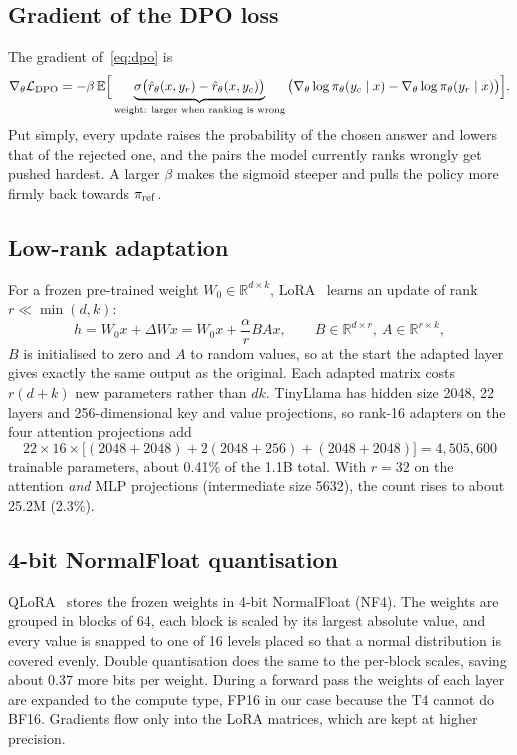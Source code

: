 \subsection{Gradient of the DPO loss}
The gradient of~\eqref{eq:dpo} is
\begin{equation}
  \nabla_\theta\mathcal{L}_{\mathrm{DPO}} = -\beta\,\mathbb{E}\Big[\underbrace{\sigma\big(\hat r_\theta(x,y_r)-\hat r_\theta(x,y_c)\big)}_{\text{weight: larger when ranking is wrong}}\big(\nabla_\theta\log\pi_\theta(y_c\mid x) - \nabla_\theta\log\pi_\theta(y_r\mid x)\big)\Big].
\end{equation}
Put simply, every update raises the probability of the chosen answer and lowers that of the rejected one, and the pairs the model currently ranks wrongly get pushed hardest. A larger $\beta$ makes the sigmoid steeper and pulls the policy more firmly back towards $\pi_{\mathrm{ref}}$.

\subsection{Low-rank adaptation}
For a frozen pre-trained weight $W_0\in\mathbb{R}^{d\times k}$, LoRA~\cite{hu2022lora} learns an update of rank $r\ll\min(d,k)$:
\begin{equation}
  h = W_0x + \Delta Wx = W_0x + \frac{\alpha}{r}BAx,\qquad B\in\mathbb{R}^{d\times r},\ A\in\mathbb{R}^{r\times k},
  \label{eq:lora}
\end{equation}
$B$ is initialised to zero and $A$ to random values, so at the start the adapted layer gives exactly the same output as the original. Each adapted matrix costs $r(d+k)$ new parameters rather than $dk$. TinyLlama has hidden size 2048, 22 layers and 256-dimensional key and value projections, so rank-16 adapters on the four attention projections add
\[
22\times16\times\big[(2048+2048)+2(2048+256)+(2048+2048)\big] = 4{,}505{,}600
\]
trainable parameters, about 0.41\% of the 1.1B total. With $r=32$ on the attention \emph{and} MLP projections (intermediate size 5632), the count rises to about 25.2M (2.3\%).

\subsection{4-bit NormalFloat quantisation}
QLoRA~\cite{dettmers2023qlora} stores the frozen weights in 4-bit NormalFloat (NF4). The weights are grouped in blocks of 64, each block is scaled by its largest absolute value, and every value is snapped to one of 16 levels placed so that a normal distribution is covered evenly. Double quantisation does the same to the per-block scales, saving about 0.37 more bits per weight. During a forward pass the weights of each layer are expanded to the compute type, FP16 in our case because the T4 cannot do BF16. Gradients flow only into the LoRA matrices, which are kept at higher precision.

